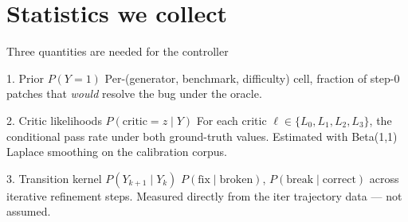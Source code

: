 \documentclass[10pt]{beamer}
\begin{document}

\section{Statistics we collect}
\hypertarget{out:4}{}

\begin{frame}{Three quantities are needed for the controller}
\vspace{0.3cm}
\begin{block}{1. Prior $P(Y{=}1)$}
Per-(generator, benchmark, difficulty) cell, fraction of step-0 patches that
\emph{would} resolve the bug under the oracle.
\end{block}

\begin{exampleblock}{2. Critic likelihoods $P(\text{critic} = z \mid Y)$}
For each critic $\ell \in \{L_0, L_1, L_2, L_3\}$, the conditional pass rate
under both ground-truth values. Estimated with Beta(1,1) Laplace smoothing on
the calibration corpus.
\end{exampleblock}

\begin{alertblock}{3. Transition kernel $P(Y_{k+1} \mid Y_k)$}
$P(\text{fix} \mid \text{broken})$, $P(\text{break} \mid \text{correct})$
across iterative refinement steps. Measured directly from the iter trajectory
data --- not assumed.
\end{alertblock}
\end{frame}

\end{document}
